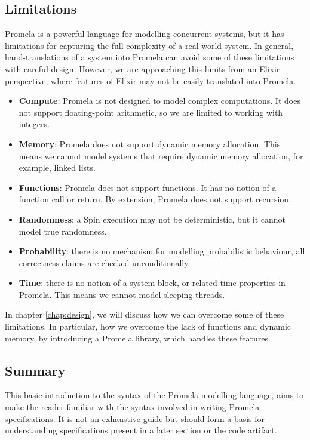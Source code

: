\subsection{Limitations} \label{sec:promela_limitations}
Promela is a powerful language for modelling concurrent systems, but it has limitations for capturing the full complexity of a real-world system. In general, hand-translations of a system into Promela can avoid some of these limitations with careful design. However, we are approaching this limits from an Elixir perspective, where features of Elixir may not be easily translated into Promela.
\begin{itemize}
    \item \textbf{Compute}: Promela is not designed to model complex computations. It does not support floating-point arithmetic, so we are limited to working with integers.
    \item \textbf{Memory}: Promela does not support dynamic memory allocation. This means we cannot model systems that require dynamic memory allocation, for example, linked lists.
    \item \textbf{Functions}: Promela does not support functions. It has no notion of a function call or return. By extension, Promela does not support recursion.
    \item \textbf{Randomness}: a Spin execution may not be deterministic, but it cannot model true randomness.
    \item \textbf{Probability}: there is no mechanism for modelling probabilistic behaviour, all correctness claims are checked unconditionally.
    \item \textbf{Time}: there is no notion of a system block, or related time properties in Promela. This means we cannot model sleeping threads.
\end{itemize}
In chapter \ref{chap:design}, we will discuss how we can overcome some of these limitations. In particular, how we overcome the lack of functions and dynamic memory, by introducing a Promela library, which handles these features.
\subsection{Summary}
This basic introduction to the syntax of the Promela modelling language, aims to make the reader familiar with the syntax involved in writing Promela specifications. It is not an exhaustive guide but should form a basis for understanding specifications present in a later section or the code artifact.

